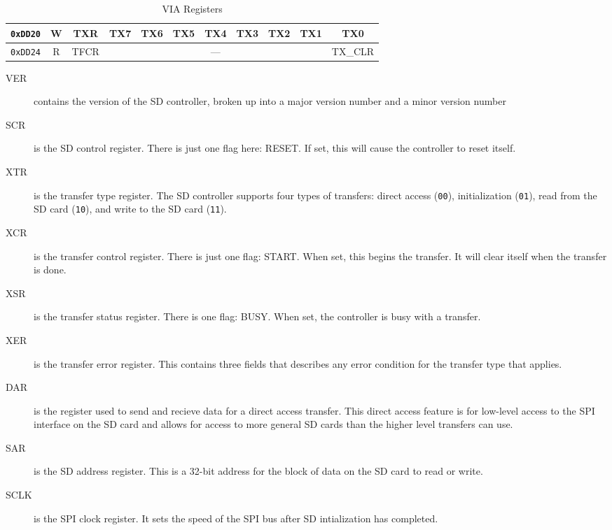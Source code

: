 \begin{table}[h]
\begin{center}
\begin{tabular}{|c|c|c|c|c|c|c|c|c|c|c|}
            \verb+0xDD20+ & W & TXR & TX7 & TX6 & TX5 & TX4 & TX3 & TX2 & TX1 & TX0 \\ \hline
            \verb+0xDD24+ & R & TFCR & \multicolumn{7}{|c|}{---} & TX\_CLR \\ \hline
        \end{tabular}

    \end{center}
    \caption{VIA Registers}
    \label{tab:via_reg}
\end{table}

\begin{description}
    \item[VER] contains the version of the SD controller, broken up into a major version number and a minor version number

    \item[SCR] is the SD control register. There is just one flag here: RESET. If set, this will cause the controller to reset itself.

    \item[XTR] is the transfer type register. The SD controller supports four types of transfers: direct access (\verb+00+), initialization (\verb+01+), read from the SD card (\verb+10+), and write to the SD card (\verb+11+).

    \item[XCR] is the transfer control register. There is just one flag: START. When set, this begins the transfer. It will clear itself when the transfer is done.

    \item[XSR] is the transfer status register. There is one flag: BUSY. When set, the controller is busy with a transfer.

    \item[XER] is the transfer error register. This contains three fields that describes any error condition for the transfer type that applies.

    \item[DAR] is the register used to send and recieve data for a direct access transfer. This direct access feature is for low-level access to the SPI interface on the SD card and allows for access to more general SD cards than the higher level transfers can use.

    \item[SAR] is the SD address register. This is a 32-bit address for the block of data on the SD card to read or write.

    \item[SCLK] is the SPI clock register. It sets the speed of the SPI bus after SD intialization has completed.


\end{description}
